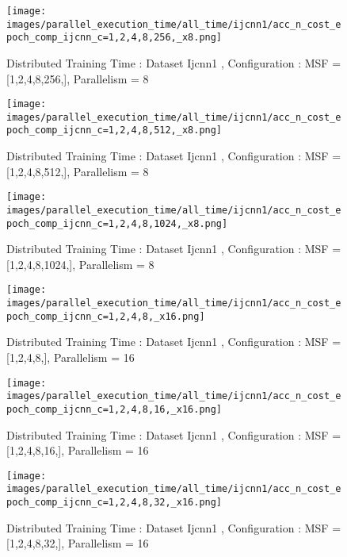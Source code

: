 \begin{figure*}[htbp]
\centering
\texttt{[image: images/parallel\_execution\_time/all\_time/ijcnn1/acc\_n\_cost\_epoch\_comp\_ijcnn\_c=1,2,4,8,256,\_x8.png]}
\caption{Distributed Training Time : Dataset Ijcnn1 , Configuration : MSF = [1,2,4,8,256,], Parallelism = 8}
\label{fig:dis-msf-tr-time-ijcnn1-x8}
\end{figure*}


\begin{figure*}[htbp]
\centering
\texttt{[image: images/parallel\_execution\_time/all\_time/ijcnn1/acc\_n\_cost\_epoch\_comp\_ijcnn\_c=1,2,4,8,512,\_x8.png]}
\caption{Distributed Training Time : Dataset Ijcnn1 , Configuration : MSF = [1,2,4,8,512,], Parallelism = 8}
\label{fig:dis-msf-tr-time-ijcnn1-x8}
\end{figure*}


\begin{figure*}[htbp]
\centering
\texttt{[image: images/parallel\_execution\_time/all\_time/ijcnn1/acc\_n\_cost\_epoch\_comp\_ijcnn\_c=1,2,4,8,1024,\_x8.png]}
\caption{Distributed Training Time : Dataset Ijcnn1 , Configuration : MSF = [1,2,4,8,1024,], Parallelism = 8}
\label{fig:dis-msf-tr-time-ijcnn1-x8}
\end{figure*}


\begin{figure*}[htbp]
\centering
\texttt{[image: images/parallel\_execution\_time/all\_time/ijcnn1/acc\_n\_cost\_epoch\_comp\_ijcnn\_c=1,2,4,8,\_x16.png]}
\caption{Distributed Training Time : Dataset Ijcnn1 , Configuration : MSF = [1,2,4,8,], Parallelism = 16}
\label{fig:dis-msf-tr-time-ijcnn1-x16}
\end{figure*}


\begin{figure*}[htbp]
\centering
\texttt{[image: images/parallel\_execution\_time/all\_time/ijcnn1/acc\_n\_cost\_epoch\_comp\_ijcnn\_c=1,2,4,8,16,\_x16.png]}
\caption{Distributed Training Time : Dataset Ijcnn1 , Configuration : MSF = [1,2,4,8,16,], Parallelism = 16}
\label{fig:dis-msf-tr-time-ijcnn1-x16}
\end{figure*}


\begin{figure*}[htbp]
\centering
\texttt{[image: images/parallel\_execution\_time/all\_time/ijcnn1/acc\_n\_cost\_epoch\_comp\_ijcnn\_c=1,2,4,8,32,\_x16.png]}
\caption{Distributed Training Time : Dataset Ijcnn1 , Configuration : MSF = [1,2,4,8,32,], Parallelism = 16}
\label{fig:dis-msf-tr-time-ijcnn1-x16}
\end{figure*}


